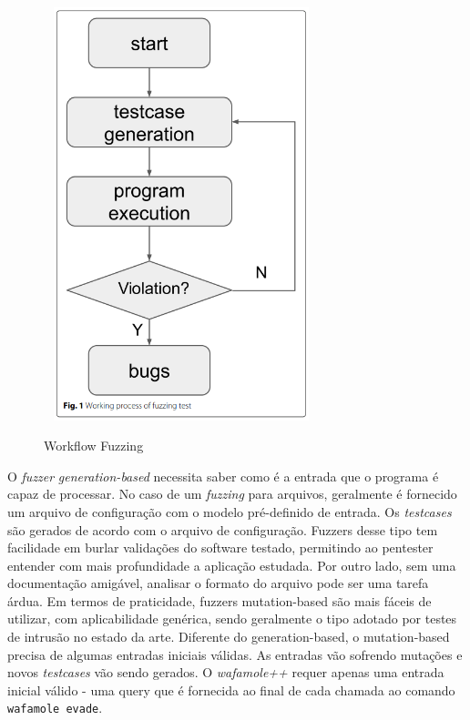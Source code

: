 \begin{figure}[ht]
    \centering
    \caption{Workflow Fuzzing}
    \includegraphics[width=8cm,height=12cm,keepaspectratio]{figuras/fuzzing imagem.png} 
    \label{fig:internet} 
\end{figure}

O \textit{fuzzer} \textit{generation-based} necessita saber como é a entrada que o programa é capaz de processar. No caso de um \textit{fuzzing} para arquivos, geralmente é fornecido um arquivo de configuração com o modelo pré-definido de entrada. Os \textit{testcases} são gerados de acordo com o arquivo de configuração. Fuzzers desse tipo tem facilidade em burlar validações do software testado, permitindo ao pentester entender com mais profundidade a aplicação estudada. Por outro lado, sem uma documentação amigável, analisar o formato do arquivo pode ser uma tarefa árdua.
Em termos de praticidade, fuzzers mutation-based são mais fáceis de utilizar, com aplicabilidade genérica, sendo geralmente o tipo adotado por testes de intrusão no estado da arte. Diferente do generation-based, o mutation-based precisa de algumas entradas iniciais válidas. As entradas vão sofrendo mutações e novos \textit{testcases} vão sendo gerados. O \textit{wafamole++} requer apenas uma entrada inicial válido - uma query que é fornecida ao final de cada chamada ao comando \verb+wafamole evade+.

